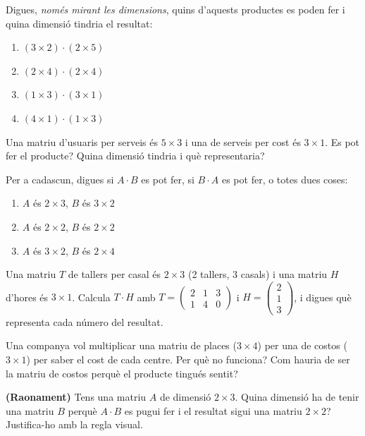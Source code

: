 \begin{exercicis}
\begin{exlist}
  \item Digues, \emph{només mirant les dimensions}, quins d'aquests productes es
        poden fer i quina dimensió tindria el resultat:
        \begin{enumerate}[label=\alph*), leftmargin=1.6em, topsep=2pt]
          \item $(3\times 2)\cdot(2\times 5)$
          \item $(2\times 4)\cdot(2\times 4)$
          \item $(1\times 3)\cdot(3\times 1)$
          \item $(4\times 1)\cdot(1\times 3)$
        \end{enumerate}
  \item Una matriu d'usuaris per serveis és $5\times 3$ i una de serveis per cost
        és $3\times 1$. Es pot fer el producte? Quina dimensió tindria i què
        representaria?
  \item Per a cadascun, digues si $A\cdot B$ es pot fer, si $B\cdot A$ es pot fer,
        o totes dues coses:
        \begin{enumerate}[label=\alph*), leftmargin=1.6em, topsep=2pt]
          \item $A$ és $2\times 3$, $B$ és $3\times 2$
          \item $A$ és $2\times 2$, $B$ és $2\times 2$
          \item $A$ és $3\times 2$, $B$ és $2\times 4$
        \end{enumerate}
  \item Una matriu $T$ de tallers per casal és $2\times 3$ (2 tallers, 3 casals) i
        una matriu $H$ d'hores és $3\times 1$. Calcula $T\cdot H$ amb
        $T=\begin{pmatrix} 2 & 1 & 3 \\ 1 & 4 & 0 \end{pmatrix}$ i
        $H=\begin{pmatrix} 2 \\ 1 \\ 3 \end{pmatrix}$, i digues què representa cada
        número del resultat.
  \item Una companya vol multiplicar una matriu de places ($3\times 4$) per una de
        costos ($3\times 1$) per saber el cost de cada centre. Per què no funciona?
        Com hauria de ser la matriu de costos perquè el producte tingués sentit?
  \item \textbf{(Raonament)} Tens una matriu $A$ de dimensió $2\times 3$. Quina
        dimensió ha de tenir una matriu $B$ perquè $A\cdot B$ es pugui fer i el
        resultat sigui una matriu $2\times 2$? Justifica-ho amb la regla visual.
\end{exlist}
\end{exercicis}

